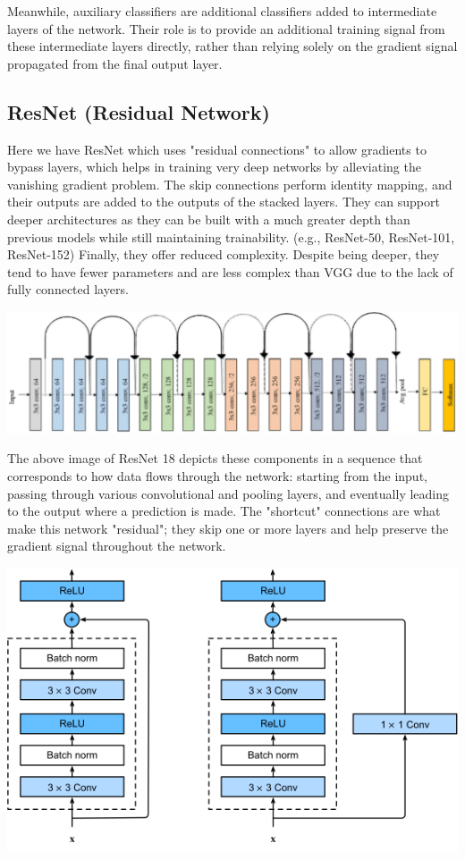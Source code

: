 \documentclass{article}
\begin{document}
        Meanwhile, auxiliary classifiers are additional classifiers added to intermediate layers of the network. Their role is to provide an additional training signal from these intermediate layers directly, rather than relying solely on the gradient signal propagated from the final output layer.
 
    \subsection{ResNet (Residual Network)}
        Here we have ResNet which uses "residual connections" to allow gradients to bypass layers, which helps in training very deep networks by alleviating the vanishing gradient problem. The skip connections perform identity mapping, and their outputs are added to the outputs of the stacked layers. They can support deeper architectures as they can be built with a much greater depth than previous models while still maintaining trainability.  (e.g., ResNet-50, ResNet-101, ResNet-152) Finally, they offer reduced complexity. Despite being deeper, they tend to have fewer parameters and are less complex than VGG due to the lack of fully connected layers.

        \begin{center}
            \includegraphics[scale=0.35]{images/ResNet.png}
        \end{center}

        The above image of ResNet 18 depicts these components in a sequence that corresponds to how data flows through the network: starting from the input, passing through various convolutional and pooling layers, and eventually leading to the output where a prediction is made. The "shortcut" connections are what make this network "residual"; they skip one or more layers and help preserve the gradient signal throughout the network.

        \begin{center}
            \includegraphics[scale=0.35]{images/resnet-block.png}
        \end{center}
\end{document}
